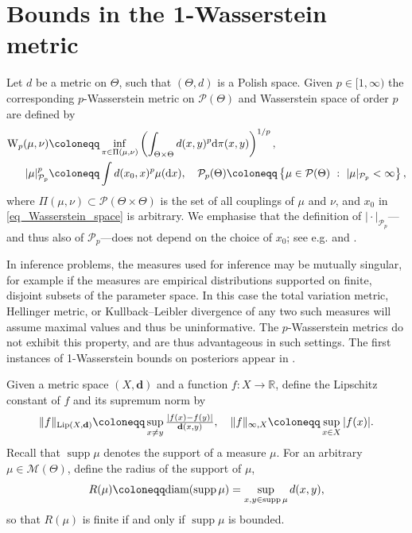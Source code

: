 \documentclass[a4paper]{scrartcl}
\theoremstyle{definition}
\numberwithin{equation}{section}
\newcommand{\R}{\mathbb{R}}
\newcommand{\rd}{\mathrm{d}}
\newcommand{\diam}[1]{\textup{diam}({#1})}
\DeclareMathOperator{\supp}{supp}
\newcommand{\abs}[1]{\vert #1\vert}
\newcommand{\norm}[1]{\Vert #1 \Vert}
\newcommand{\Lip}[0]{\textup{Lip}}
\newcommand{\Was}[0]{\textup{W}}
\begin{document}
\section{Bounds in the 1-Wasserstein metric}
\label{sectionW1bounds}

Let $d$ be a metric on $\Theta$, such that $(\Theta,d)$ is a Polish space. 
Given $p\in [1,\infty)$ the corresponding $p$-Wasserstein metric on $\mathcal{P}(\Theta)$ and Wasserstein space of order $p$ are defined by 
\begin{subequations}
\begin{align}
 \Was_p(\mu,\nu)\coloneqq& \inf_{\pi\in\Pi(\mu,\nu)}\left(\int_{\Theta\times\Theta} d(x,y)^p\rd \pi( x,y) \right)^{1/p},
 \label{eq_Wasserstein_metric}
 \\
 \abs{\mu}_{\mathcal{P}_p}^{p}\coloneqq&\int d(x_0,x)^p\mu(\rd x),\quad \mathcal{P}_p(\Theta)\coloneqq \left\{\mu\in\mathcal{P}(\Theta)\ :\ \abs{\mu}_{\mathcal{P}_p}<\infty \right\}, 
\label{eq_Wasserstein_space}
\end{align} 
\end{subequations}
where $\Pi(\mu,\nu)\subset \mathcal{P}(\Theta\times \Theta)$ is the set of all couplings of $\mu$ and $\nu$, and $x_0$ in \eqref{eq_Wasserstein_space} is arbitrary. 
We emphasise that the definition of $\abs{\cdot}_{\mathcal{P}_p}$---and thus also of $\mathcal{P}_p$---does not depend on the choice of $x_0$; see e.g. \cite[Definition 6.1, Definition 6.4]{Villani2009} and \cite[Definition 4.3]{Ambrosio2021}.

In inference problems, the measures used for inference may be mutually singular, for example if the measures are empirical distributions supported on finite, disjoint subsets of the parameter space.
In this case the total variation metric, Hellinger metric, or Kullback--Leibler divergence of any two such measures will assume maximal values and thus be uninformative.
The $p$-Wasserstein metrics do not exhibit this property, and are thus advantageous in such settings. 
The first instances of 1-Wasserstein bounds on posteriors appear in \cite[Section 5]{Sprungk2020}.

Given a metric space $(X,\mathbf{d})$ and a function $f:X\to\R$, define the Lipschitz constant of $f$ and its supremum norm by 
\begin{equation}
\label{eq_Lipschitz_constant_and_supremum_norm}
 \norm{f}_{\Lip(X,\mathbf{d})}\coloneqq \sup_{x\neq y} \tfrac{\abs{f(x)-f(y)}}{\mathbf{d}(x,y)},\quad \norm{f}_{\infty,X}\coloneqq \sup_{x\in X}\abs{f(x)}.
\end{equation}
Recall that $\supp{\mu}$ denotes the support of a measure $\mu$.
For an arbitrary $\mu\in\mathcal{M}(\Theta)$, define the radius of the support of $\mu$,
 \begin{equation}
  \label{eq_radius_parameter}
  R(\mu)\coloneqq \diam{\supp{\mu}}=\sup_{x,y\in\supp{\mu}}d(x,y),
 \end{equation}
 so that $R(\mu)$ is finite if and only if $\supp{\mu}$ is bounded.
  
\end{document}
